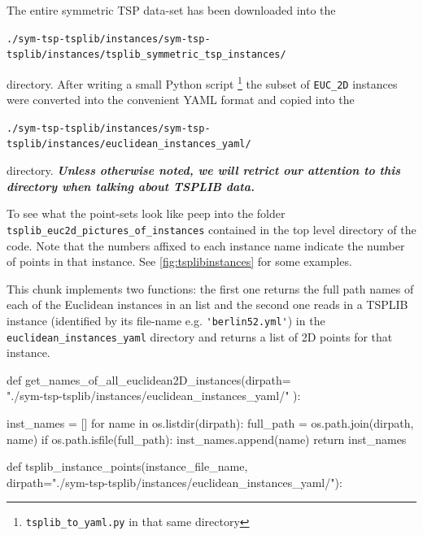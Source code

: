 The entire symmetric TSP data-set has been downloaded into the 

\begin{displayquote}
\texttt{./sym-tsp-tsplib/instances/sym-tsp-tsplib/instances/tsplib\_symmetric\_tsp\_instances/} 
\end{displayquote}

directory. 
After writing a small Python script \footnote{\texttt{tsplib\_to\_yaml.py} in that same directory} the subset of \verb|EUC_2D| instances
were converted into the convenient YAML format and copied into the 

\begin{displayquote}
\color{blue}
\texttt{./sym-tsp-tsplib/instances/sym-tsp-tsplib/instances/euclidean\_instances\_yaml/} 
\end{displayquote}
directory. \textit{\textbf{Unless otherwise noted, we will retrict our attention to this directory when talking about TSPLIB data.}}

To see what the point-sets look like peep into the folder \verb|tsplib_euc2d_pictures_of_instances| contained in the top level directory of the code. 
Note that the numbers affixed to each instance name indicate the number of points in that instance. See \autoref{fig:tsplibinstances} for some examples. 

This chunk implements two functions: the first one returns the full path names of each of the Euclidean instances in an list and  the second one
reads in a TSPLIB instance (identified by its file-name e.g. \verb|'berlin52.yml'|) in the \verb|euclidean_instances_yaml| directory 
and returns a list of 2D points for that instance. 

\nwenddocs{}\endmoddef\nwstartdeflinemarkup{}\nwenddeflinemarkup

def get_names_of_all_euclidean2D_instances(dirpath=\\
         "./sym-tsp-tsplib/instances/euclidean_instances_yaml/" ):
     
     inst_names = []
     for name in os.listdir(dirpath):
         full_path = os.path.join(dirpath, name)
         if os.path.isfile(full_path):
             inst_names.append(name)
     return inst_names

def tsplib_instance_points(instance_file_name,\\
                           dirpath="./sym-tsp-tsplib/instances/euclidean_instances_yaml/"):


